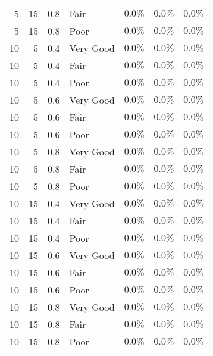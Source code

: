 \begin{longtable}{rrrlrrr}
5 & 15 & 0.8 & Fair & $0.0\%$ & $0.0\%$ & $0.0\%$ \\ 
5 & 15 & 0.8 & Poor & $0.0\%$ & $0.0\%$ & $0.0\%$ \\ 
10 & 5 & 0.4 & Very Good & $0.0\%$ & $0.0\%$ & $0.0\%$ \\ 
10 & 5 & 0.4 & Fair & $0.0\%$ & $0.0\%$ & $0.0\%$ \\ 
10 & 5 & 0.4 & Poor & $0.0\%$ & $0.0\%$ & $0.0\%$ \\ 
10 & 5 & 0.6 & Very Good & $0.0\%$ & $0.0\%$ & $0.0\%$ \\ 
10 & 5 & 0.6 & Fair & $0.0\%$ & $0.0\%$ & $0.0\%$ \\ 
10 & 5 & 0.6 & Poor & $0.0\%$ & $0.0\%$ & $0.0\%$ \\ 
10 & 5 & 0.8 & Very Good & $0.0\%$ & $0.0\%$ & $0.0\%$ \\ 
10 & 5 & 0.8 & Fair & $0.0\%$ & $0.0\%$ & $0.0\%$ \\ 
10 & 5 & 0.8 & Poor & $0.0\%$ & $0.0\%$ & $0.0\%$ \\ 
10 & 15 & 0.4 & Very Good & $0.0\%$ & $0.0\%$ & $0.0\%$ \\ 
10 & 15 & 0.4 & Fair & $0.0\%$ & $0.0\%$ & $0.0\%$ \\ 
10 & 15 & 0.4 & Poor & $0.0\%$ & $0.0\%$ & $0.0\%$ \\ 
10 & 15 & 0.6 & Very Good & $0.0\%$ & $0.0\%$ & $0.0\%$ \\ 
10 & 15 & 0.6 & Fair & $0.0\%$ & $0.0\%$ & $0.0\%$ \\ 
10 & 15 & 0.6 & Poor & $0.0\%$ & $0.0\%$ & $0.0\%$ \\ 
10 & 15 & 0.8 & Very Good & $0.0\%$ & $0.0\%$ & $0.0\%$ \\ 
10 & 15 & 0.8 & Fair & $0.0\%$ & $0.0\%$ & $0.0\%$ \\ 
10 & 15 & 0.8 & Poor & $0.0\%$ & $0.0\%$ & $0.0\%$ \\ 
 \bottomrule
\end{longtable}

